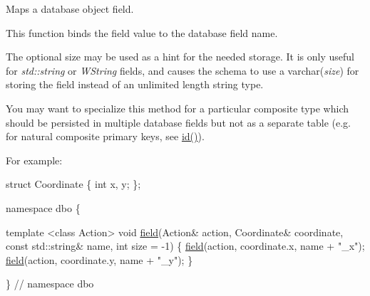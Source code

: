 Maps a database object field. 

This function binds the field {\ttfamily value} to the database field {\ttfamily name}.

The optional {\ttfamily size} may be used as a hint for the needed storage. It is only useful for {\itshape std\+::string} or {\itshape W\+String} fields, and causes the schema to use a {\ttfamily varchar(}{\itshape {\ttfamily size}}{\ttfamily )} for storing the field instead of an unlimited length string type.

You may want to specialize this method for a particular composite type which should be persisted in multiple database fields but not as a separate table (e.\+g. for natural composite primary keys, see \hyperlink{namespacedbo_a8d25907296ae8360b3120b7492022c1d}{id()}).

For example\+: 
\begin{DoxyCode}
\textcolor{keyword}{struct }Coordinate \{
  \textcolor{keywordtype}{int} x, y;
\};

  \textcolor{keyword}{namespace }dbo \{

    \textcolor{keyword}{template} <\textcolor{keyword}{class} Action>
    \textcolor{keywordtype}{void} \hyperlink{namespacedbo_ad1f50f02cb050acf946807959252a93f}{field}(Action& action, Coordinate& coordinate, \textcolor{keyword}{const} std::string& name, \textcolor{keywordtype}{int} size = -1)
    \{
      \hyperlink{namespacedbo_ad1f50f02cb050acf946807959252a93f}{field}(action, coordinate.x, name + \textcolor{stringliteral}{"\_x"});
      \hyperlink{namespacedbo_ad1f50f02cb050acf946807959252a93f}{field}(action, coordinate.y, name + \textcolor{stringliteral}{"\_y"});
    \}

  \} \textcolor{comment}{// namespace dbo}
\end{DoxyCode}


